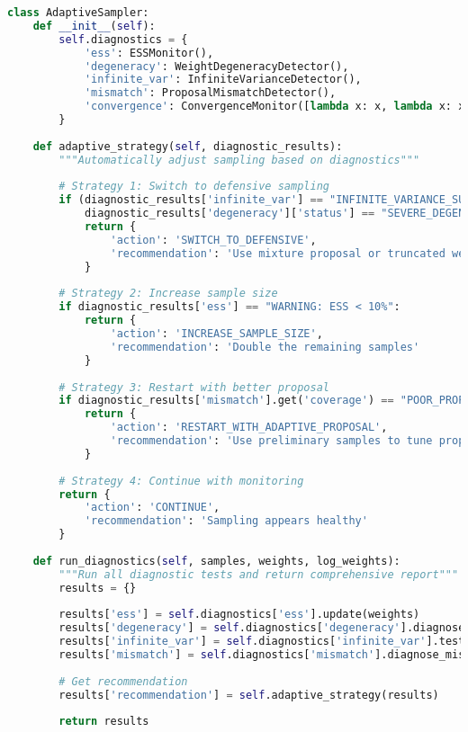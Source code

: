 \documentclass[11pt]{article}
\begin{document}
\begin{lstlisting}[language=Python, basicstyle=\small]
class AdaptiveSampler:
    def __init__(self):
        self.diagnostics = {
            'ess': ESSMonitor(),
            'degeneracy': WeightDegeneracyDetector(),
            'infinite_var': InfiniteVarianceDetector(),
            'mismatch': ProposalMismatchDetector(),
            'convergence': ConvergenceMonitor([lambda x: x, lambda x: x**2])
        }
        
    def adaptive_strategy(self, diagnostic_results):
        """Automatically adjust sampling based on diagnostics"""
        
        # Strategy 1: Switch to defensive sampling
        if (diagnostic_results['infinite_var'] == "INFINITE_VARIANCE_SUSPECTED" or
            diagnostic_results['degeneracy']['status'] == "SEVERE_DEGENERACY"):
            return {
                'action': 'SWITCH_TO_DEFENSIVE',
                'recommendation': 'Use mixture proposal or truncated weights'
            }
        
        # Strategy 2: Increase sample size
        if diagnostic_results['ess'] == "WARNING: ESS < 10%":
            return {
                'action': 'INCREASE_SAMPLE_SIZE',
                'recommendation': 'Double the remaining samples'
            }
        
        # Strategy 3: Restart with better proposal
        if diagnostic_results['mismatch'].get('coverage') == "POOR_PROPOSAL_COVERAGE":
            return {
                'action': 'RESTART_WITH_ADAPTIVE_PROPOSAL',
                'recommendation': 'Use preliminary samples to tune proposal'
            }
        
        # Strategy 4: Continue with monitoring
        return {
            'action': 'CONTINUE',
            'recommendation': 'Sampling appears healthy'
        }
        
    def run_diagnostics(self, samples, weights, log_weights):
        """Run all diagnostic tests and return comprehensive report"""
        results = {}
        
        results['ess'] = self.diagnostics['ess'].update(weights)
        results['degeneracy'] = self.diagnostics['degeneracy'].diagnose(weights)
        results['infinite_var'] = self.diagnostics['infinite_var'].test_infinite_variance(log_weights)
        results['mismatch'] = self.diagnostics['mismatch'].diagnose_mismatch(samples, log_weights)
        
        # Get recommendation
        results['recommendation'] = self.adaptive_strategy(results)
        
        return results
\end{lstlisting}
\end{document}
